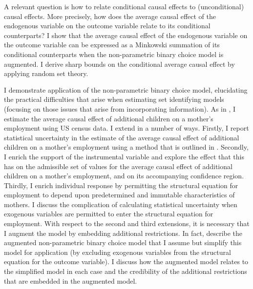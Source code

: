\documentclass[12pt,a4paper,twoside]{article}
\numberwithin{equation}{section}
\begin{document}
A relevant question is how to relate conditional causal effects to (unconditional) causal effects. More precisely, how does the average causal effect of the endogenous variable on the outcome variable relate to its conditional counterparts? I show that the average causal effect of the endogenous variable on the outcome variable can be expressed as a Minkowski summation of its conditional counterparts when the non-parametric binary choice model is augmented. I derive sharp bounds on the conditional average causal effect by applying random set theory. 

I demonstrate application of the non-parametric binary choice model, elucidating the practical difficulties that arise when estimating set identifying models (focusing on those issues that arise from incorporating information). As in \cite{cr13}, I estimate the average causal effect of additional children on a mother's employment using US census data. I extend \cite{cr13} in a number of ways. Firstly, I report statistical uncertainty in the estimate of the average causal effect of additional children on a mother's employment using a method that is outlined in \cite{cHlr13}. Secondly, I enrich the support of the instrumental variable and explore the effect that this has on the admissible set of values for the average causal effect of additional children on a mother's employment, and on its accompanying confidence region. Thirdly, I enrich individual response by permitting the structural equation for employment to depend upon predetermined and immutable characteristics of mothers. I discuss the complication of calculating statistical uncertainty when exogenous variables are permitted to enter the structural equation for employment. With respect to the second and third extensions, it is necessary that I augment the model by embedding additional restrictions. In fact, \cite{cr13} describe the augmented non-parametric binary choice model that I assume but simplify this model for application (by excluding exogenous variables from the structural equation for the outcome variable). I discuss how the augmented model relates to the simplified model in each case and the credibility of the additional restrictions that are embedded in the augmented model.
\end{document}
